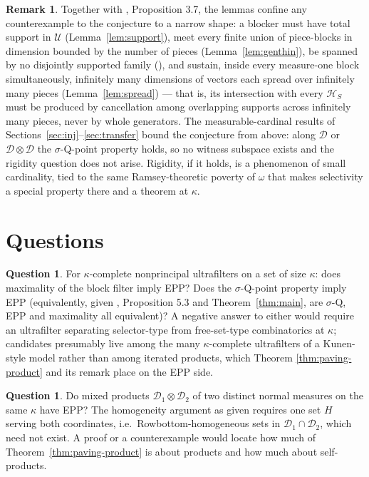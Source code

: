\documentclass[11pt]{article}
\theoremstyle{definition}
\newtheorem{question}[theorem]{Question}
\newtheorem{remark}[theorem]{Remark}
\newcommand{\HH}{\mathcal{H}}
\newcommand{\U}{\mathcal{U}}
\newcommand{\D}{\mathcal{D}}
\begin{document}
\begin{remark}\label{rem:shape}
Together with \cite{FWII}, Proposition 3.7, the lemmas confine any
counterexample to the conjecture to a narrow shape: a blocker must have
total support in $\U$ (Lemma~\ref{lem:support}), meet every finite union
of piece-blocks in dimension bounded by the number of pieces
(Lemma~\ref{lem:genthin}), be spanned by no disjointly supported family
(\cite{FWII}), and sustain, inside every measure-one block
simultaneously, infinitely many dimensions of vectors each spread over
infinitely many pieces (Lemma~\ref{lem:spread}) --- that is, its
intersection with every $\HH_S$ must be produced by cancellation among
overlapping supports across infinitely many pieces, never by whole
generators. The measurable-cardinal results of
Sections~\ref{sec:inj}--\ref{sec:transfer} bound the conjecture from above:
along $\D$ or $\D\otimes\D$ the $\sigma$-Q-point property holds, so no
witness subspace exists and the rigidity question does not arise.
Rigidity, if it holds, is a phenomenon of small cardinality, tied to the
same Ramsey-theoretic poverty of $\omega$ that makes selectivity a
special property there and a theorem at $\kappa$.
\end{remark}

\section{Questions}\label{sec:questions}

\begin{question}\label{q:EPP}
For $\kappa$-complete nonprincipal ultrafilters on a set of size
$\kappa$: does maximality of the block filter imply EPP? Does the
$\sigma$-Q-point property imply EPP (equivalently, given
\cite{FWIII}, Proposition 5.3 and Theorem~\ref{thm:main}, are
$\sigma$-Q, EPP and maximality all equivalent)? A negative answer to
either would require an ultrafilter separating selector-type from
free-set-type combinatorics at $\kappa$; candidates presumably live
among the many $\kappa$-complete ultrafilters of a Kunen-style model
rather than among iterated products, which Theorem
\ref{thm:paving-product} and its remark place on the EPP side.
\end{question}

\begin{question}\label{q:mixed}
Do mixed products $\D_1\otimes\D_2$ of two distinct normal measures on
the same $\kappa$ have EPP? The homogeneity argument as given requires
one set $H$ serving both coordinates, i.e.\ Rowbottom-homogeneous sets
in $\D_1\cap\D_2$, which need not exist. A proof or a counterexample
would locate how much of Theorem~\ref{thm:paving-product} is about
products and how much about self-products.
\end{question}
\end{document}
